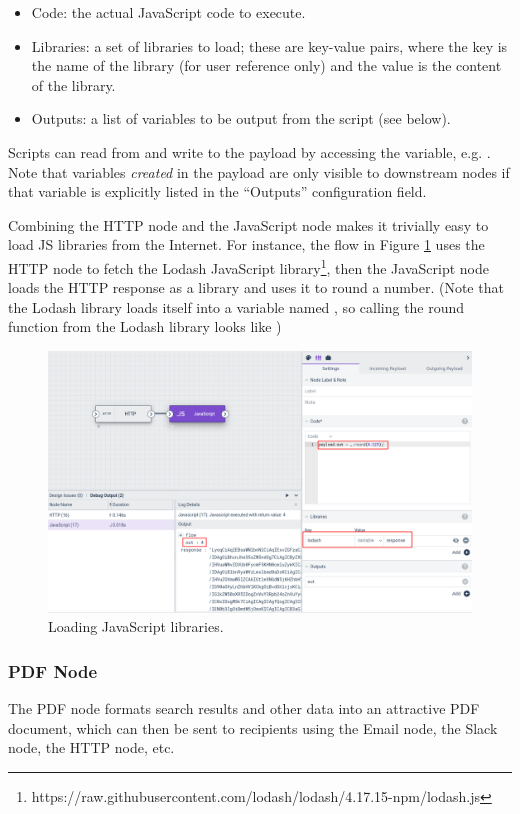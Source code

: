\begin{itemize}
\item Code: the actual JavaScript code to execute.
\item Libraries: a set of libraries to load; these are key-value pairs, where the key is the name of the library (for user reference only) and the value is the content of the library.
\item Outputs: a list of variables to be output from the script (see below).
\end{itemize}

Scripts can read from and write to the payload by accessing the  variable, e.g. . Note that variables \emph{created} in the payload are only visible to downstream nodes if that variable is explicitly listed in the ``Outputs'' configuration field.

Combining the HTTP node and the JavaScript node makes it trivially easy to load JS libraries from the Internet. For instance, the flow in Figure \ref{fig:js-flow} uses the HTTP node to fetch the Lodash JavaScript library\footnote{https://raw.githubusercontent.com/lodash/lodash/4.17.15-npm/lodash.js}, then the JavaScript node loads the HTTP response as a library and uses it to round a number. (Note that the Lodash library loads itself into a variable named \code{\_}, so calling the round function from the Lodash library looks like )

\begin{figure}
	\includegraphics[width=0.85\linewidth]{images/js-flow.png}
	\caption{Loading JavaScript libraries.}
	\label{fig:js-flow}
\end{figure}

\subsubsection{PDF Node}
The PDF node formats search results and other data into an attractive PDF document, which can then be sent to recipients using the Email node, the Slack node, the HTTP node, etc.


